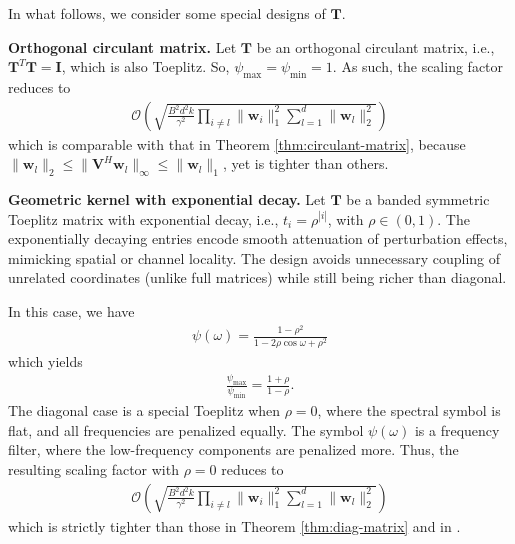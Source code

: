 \documentclass[journal]{IEEEtran} %
\def\vw{{\bm{w}}}
\def\mI{{\bm{I}}}
\def\mT{{\bm{T}}}
\def\mV{{\bm{V}}}
\def\gO{{\mathcal{O}}}
\newcommand{\Norm}[1]{\|#1\|}
\newcommand{\Abs}[1]{|#1|}
\begin{document}
In what follows, we consider some special designs of $\mT$.

\textbf{Orthogonal circulant matrix.} Let $\mT$ be an orthogonal circulant matrix, i.e., $\mT^T \mT = \mI $, which is also Toeplitz. So, $\psi_{\max}=\psi_{\min}=1$. 
As such, the scaling factor reduces to 
\begin{align}
    \gO\left(\sqrt{\frac{B^2d^2k}{\gamma^2} \prod_{i\ne l} \Norm{\vw_i}_1^2 \sum_{l=1}^d \Norm{\vw_l}_2^2}\right)
\end{align}
which is comparable with that in Theorem \ref{thm:circulant-matrix}, because $\Norm{\vw_l}_2 \le \Norm{\mV^H \vw_l}_{\infty} \le \Norm{\vw_l}_1$, yet is tighter than others.

\textbf{Geometric kernel with exponential decay.}
Let $\mT$ be a banded symmetric Toeplitz matrix with exponential decay, i.e., $t_i=\rho^{\Abs{i}}$, with $\rho \in (0,1)$.
The exponentially decaying entries encode smooth attenuation of perturbation effects, mimicking spatial or channel locality. The design avoids unnecessary coupling of unrelated coordinates (unlike full matrices) while still being richer than diagonal.

In this case, we have
\begin{align}
    \psi(\omega)=\frac{1-\rho^2}{1-2\rho \cos\omega + \rho^2}
\end{align}
which yields
\begin{align}
    \frac{\psi_{\max}}{\psi_{\min}} = \frac{1+\rho}{1-\rho}.
\end{align}
The diagonal case is a special Toeplitz when $\rho=0$, where the spectral symbol is flat, and all frequencies are penalized equally. The symbol $\psi(\omega)$ is a frequency filter, where the low-frequency components are penalized more. Thus, the resulting scaling factor with $\rho=0$ reduces to 
\begin{align}
    \gO\left(\sqrt{\frac{B^2d^2k}{\gamma^2} \prod_{i\ne l} \Norm{\vw_i}_1^2 \sum_{l=1}^d \Norm{\vw_l}_2^2}\right)
\end{align}
which is strictly tighter than those in Theorem \ref{thm:diag-matrix} and in \cite{neyshabur2018pac}.


\end{document}
